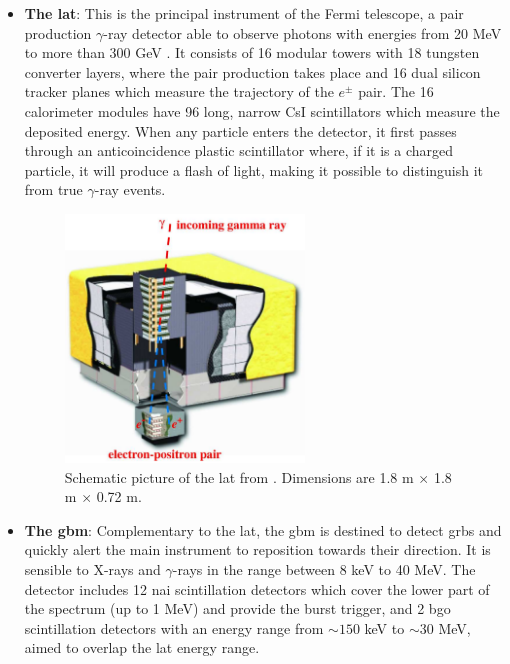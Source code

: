 \documentclass[main.tex]{subfiles}
\begin{document}
\begin{itemize}
\item \textbf{The \gls{lat}}: This is the principal instrument of the Fermi telescope, a pair production $\gamma$-ray detector able to observe photons with energies from 20 MeV to more than 300 GeV \cite{2009FermiLAT}. It consists of 16 modular towers with 18 tungsten converter layers, where the pair production takes place and 16 dual silicon tracker planes which measure the trajectory of the $e^{\pm}$ pair. The 16 calorimeter modules have 96 long, narrow CsI scintillators which measure the deposited energy. When any particle enters the detector, it first passes through an anticoincidence plastic scintillator where, if it is a charged particle, it will produce a flash of light, making it possible to distinguish it from true $\gamma$-ray events.

  \begin{figure}[h]
    \centering
    \includegraphics[width=0.60\textwidth]{Pictures/LAT.pdf}
    \caption{Schematic picture of the \gls{lat} from \cite{2009FermiLAT}. Dimensions are 1.8 m $\times$ 1.8 m $\times$ 0.72 m.}
    \label{fig:LAT}
  \end{figure}

\item \textbf{The \gls{gbm}}: Complementary to the \gls{lat}, the \gls{gbm} is destined to detect \glspl{grb} and quickly alert the main instrument to reposition towards their direction. It is sensible to X-rays and $\gamma$-rays in the range between 8 keV to 40 MeV. The detector includes 12  \gls{nai}  scintillation detectors which cover the lower part of the spectrum (up to 1 MeV) and  provide the burst trigger, and 2 \gls{bgo} scintillation detectors with an energy range from $\sim 150$ keV to $\sim 30$ MeV, aimed to overlap the \gls{lat} energy range.\\



\end{itemize}
\end{document}
